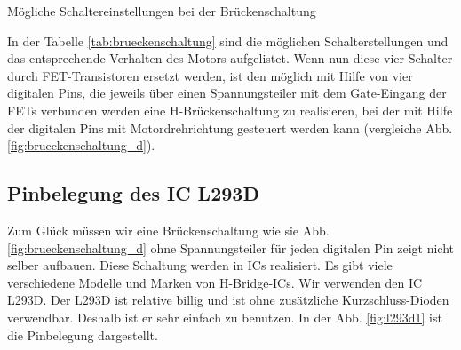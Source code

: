 \begin{table}[h]
\begin{center}
\end{center}
\caption{Mögliche Schaltereinstellungen bei der Brückenschaltung }
\label{tab:brueckenschaltung}
\end{table}%
In der Tabelle \ref{tab:brueckenschaltung} sind die möglichen Schalterstellungen und das 
entsprechende Verhalten des Motors aufgelistet. Wenn nun diese vier Schalter durch 
FET-Transistoren ersetzt werden, ist den möglich mit Hilfe von vier digitalen Pins, die 
jeweils über einen Spannungsteiler mit dem Gate-Eingang der FETs verbunden werden 
eine H-Brückenschaltung zu realisieren, bei der mit Hilfe der digitalen Pins mit Motordrehrichtung 
gesteuert werden kann (vergleiche Abb. \ref{fig:brueckenschaltung_d}).     


\clearpage
\subsection{Pinbelegung des IC L293D}

Zum Glück müssen wir eine Brückenschaltung wie sie Abb. \ref{fig:brueckenschaltung_d}
ohne Spannungsteiler für jeden digitalen Pin zeigt nicht selber aufbauen. Diese Schaltung 
werden in ICs realisiert. Es gibt viele verschiedene Modelle und Marken von H-Bridge-ICs. 
Wir verwenden den IC L293D. Der L293D ist relative billig und ist ohne zusätzliche Kurzschluss-Dioden verwendbar. Deshalb ist er sehr einfach zu benutzen. In der Abb. \ref{fig:l293d1}
ist die Pinbelegung dargestellt. 

